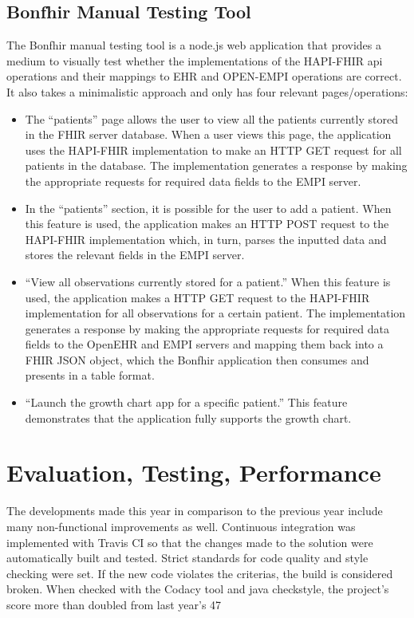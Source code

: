 \documentclass[sigconf]{acmart}
\begin{document}
\subsection{Bonfhir Manual Testing Tool}
The Bonfhir manual testing tool is a node.js web application that provides a medium to visually test whether the implementations of the HAPI-FHIR api operations and their mappings to EHR and OPEN-EMPI operations are correct. It also takes a minimalistic approach and only has four relevant pages/operations: 
\begin{itemize}
\item The “patients” page allows the user to view all the patients currently stored in the FHIR server database. When a user views this page, the application uses the HAPI-FHIR implementation to make an HTTP GET request for all patients in the database. The implementation generates a response by making the appropriate requests for required data fields to the EMPI server.
\item In the “patients” section, it is possible for the user to add a patient. When this feature is used, the application makes an HTTP POST request to the HAPI-FHIR implementation which, in turn, parses the inputted data and stores the relevant fields in the EMPI server.
\item “View all observations currently stored for a patient.” When this feature is used, the application makes a HTTP GET request to the HAPI-FHIR implementation for all observations for a certain patient. The implementation generates a response by making the appropriate requests for required data fields to the OpenEHR and EMPI servers and mapping them back into a FHIR JSON object, which the Bonfhir application then consumes and presents in a table format.
\item “Launch the growth chart app for a specific patient.” This feature demonstrates that the application fully supports the growth chart.
\end{itemize}

\section{Evaluation, Testing, Performance} 
The developments made this year in comparison to the previous year include many non-functional improvements as well. Continuous integration was implemented with Travis CI so that the changes made to the solution were automatically built and tested. Strict standards for code quality and style checking were set. If the new code violates the criterias, the build is considered broken. When checked with the Codacy tool and java checkstyle, the project’s score more than doubled from last year’s 47%
\end{document}
